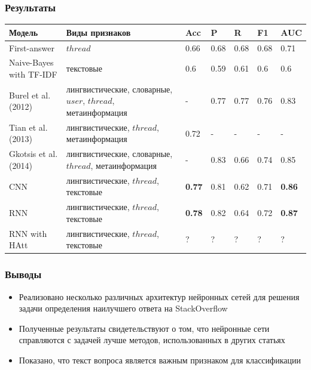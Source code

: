 \documentclass[10pt]{beamer}
\begin{document}

\begin{frame}
\frametitle{Результаты}

\begin{center}
	\small
    \begin{tabularx}{\textwidth}{| l | X | l | l | l | l | l |}
    \hline
    Модель & Виды признаков & Acc & P & R & F1 & AUC \\ \hline
    First-answer & $thread$ & 0.66 & 0.68 & 0.68 & 0.68 & 0.71 \\ \hline
    Naive-Bayes with TF-IDF & текстовые & 0.6 & 0.59 & 0.61 & 0.6 &0.6 \\ \hline
    \hline
    Burel et al. (2012) \cite{Burel} & лингвистические, словарные, $user$, $thread$, метаинформация & - & 0.77 & 0.77 & 0.76 & 0.83 \\ \hline
    Tian et al. (2013) \cite{Tian} & лингвистические, $thread$, метаинформация & 0.72 & - & - & - & - \\ \hline
    Gkotsis et al. (2014) \cite{Gkotsis} & лингвистические, словарные, $thread$, метаинформация & - & 0.83 & 0.66 & 0.74 & 0.85 \\ \hline
    \hline
    CNN & лингвистические, $thread$, текстовые & \textbf{0.77} & 0.81 & 0.62 & 0.71 & \textbf{0.86} \\ \hline
    RNN & лингвистические, $thread$, текстовые & \textbf{0.78} & 0.82 & 0.64 & 0.72 & \textbf{0.87} \\ \hline
    RNN with HAtt & лингвистические, $thread$, текстовые & ? & ? & ? & ? & ? \\ \hline
    \end{tabularx}
\end{center}
\end{frame}


\begin{frame}
\frametitle{Выводы}

\begin{itemize}
	\item Реализовано несколько различных архитектур нейронных сетей для решения задачи определения наилучшего ответа на StackOverflow
	\item Полученные результаты свидетельствуют о том, что нейронные сети справляются с задачей лучше методов, использованных в других статьях
	\item Показано, что текст вопроса является важным признаком для классификации
\end{itemize}

\end{frame}
\end{document}
